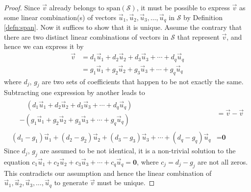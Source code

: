 \begin{proof}
Since $\vec{v}$ already belongs to $\text{span}(\mathcal{S})$, it must be possible to express $\vec{v}$ as some linear combination(s) of vectors $\vec{u}_1, \vec{u}_2, \vec{u}_3, \ldots, \vec{u}_q$ in $\mathcal{S}$ by Definition \ref{defn:span}. Now it suffices to show that it is unique. Assume the contrary that there are two distinct linear combinations of vectors in $\mathcal{S}$ that represent $\vec{v}$, and hence we can express it by
\begin{align*}
\vec{v} &= d_1\vec{u}_1 + d_2\vec{u}_2 + d_3\vec{u}_3 + \cdots + d_q\vec{u}_q \\
&= g_1\vec{u}_1 + g_2\vec{u}_2 + g_3\vec{u}_3 + \cdots + g_q\vec{u}_q
\end{align*}
where $d_j$, $g_j$ are two sets of coefficients that happen to be not exactly the same. Subtracting one expression by another leads to
\begin{align*}
\begin{aligned}
&\quad (d_1\vec{u}_1 + d_2\vec{u}_2 + d_3\vec{u}_3 + \cdots + d_q\vec{u}_q) \\
& -(g_1\vec{u}_1 + g_2\vec{u}_2 + g_3\vec{u}_3 + \cdots + g_q\vec{u}_q)
\end{aligned}
&= \vec{v} - \vec{v} \\
(d_1 - g_1)\vec{u}_1 + (d_2 - g_2)\vec{u}_2 + (d_3 - g_3)\vec{u}_3 + \cdots + (d_q - g_q)\vec{u}_q &= \textbf{0} 
\end{align*}
Since $d_j$, $g_j$ are assumed to be not identical, it is a non-trivial solution to the equation $c_1\vec{u}_1 + c_2\vec{u}_2 + c_3\vec{u}_3 + \cdots + c_q\vec{u}_q = \textbf{0}$, where $c_j = d_j - g_j$ are not all zeros. This contradicts our assumption and hence the linear combination of $\vec{u}_1, \vec{u}_2, \vec{u}_3, \ldots, \vec{u}_q$ to generate $\vec{v}$ must be unique.
\end{proof}

